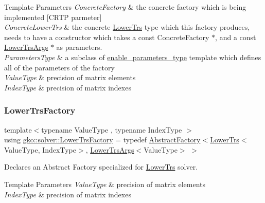 \begin{DoxyTemplParams}{Template Parameters}
{\em Concrete\+Factory} & the concrete factory which is being implemented \mbox{[}C\+R\+TP parmeter\mbox{]} \\
\hline
{\em Concrete\+Lower\+Trs} & the concrete \hyperlink{classgko_1_1solver_1_1LowerTrs}{Lower\+Trs} type which this factory produces, needs to have a constructor which takes a const Concrete\+Factory $\ast$, and a const \hyperlink{structgko_1_1solver_1_1LowerTrsArgs}{Lower\+Trs\+Args} $\ast$ as parameters. \\
\hline
{\em Parameters\+Type} & a subclass of \hyperlink{structgko_1_1enable__parameters__type}{enable\+\_\+parameters\+\_\+type} template which defines all of the parameters of the factory \\
\hline
{\em Value\+Type} & precision of matrix elements \\
\hline
{\em Index\+Type} & precision of matrix indexes \\
\hline
\end{DoxyTemplParams}
\mbox{\label{namespacegko_1_1solver_a33146299540a54a9a39ec127fc8c6c1a}} 
\subsubsection{\texorpdfstring{Lower\+Trs\+Factory}{LowerTrsFactory}}
{\footnotesize\ttfamily template$<$typename Value\+Type , typename Index\+Type $>$ \\
using \hyperlink{namespacegko_1_1solver_a33146299540a54a9a39ec127fc8c6c1a}{gko\+::solver\+::\+Lower\+Trs\+Factory} = typedef \hyperlink{classgko_1_1AbstractFactory}{Abstract\+Factory}$<$\hyperlink{classgko_1_1solver_1_1LowerTrs}{Lower\+Trs}$<$Value\+Type, Index\+Type$>$, \hyperlink{structgko_1_1solver_1_1LowerTrsArgs}{Lower\+Trs\+Args}$<$Value\+Type$>$ $>$}



Declares an Abstract Factory specialized for \hyperlink{classgko_1_1solver_1_1LowerTrs}{Lower\+Trs} solver. 


\begin{DoxyTemplParams}{Template Parameters}
{\em Value\+Type} & precision of matrix elements \\
\hline
{\em Index\+Type} & precision of matrix indexes \\
\hline
\end{DoxyTemplParams}
